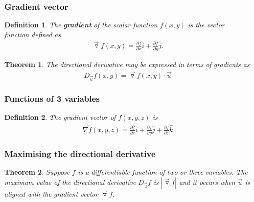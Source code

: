 \documentclass{article}
\theoremstyle{sltheorem}
\newtheorem{definition}{Definition}[section]
\newtheorem{theorem}{Theorem}[section]
\newcommand{\ih}{\widehat i}
\newcommand{\jh}{\widehat j}
\newcommand{\kh}{\widehat k}
\newcommand{\p}{\partial}
\newcommand{\grad}{\vec\triangledown}
\newcommand*\B[1]{\textbf{#1}}
\begin{document}
\subsubsection{Gradient vector}
\begin{definition}
    The \B{gradient} of the scalar function $f(x,y)$ is the vector
    function defined as
    \begin{align*}
        \grad f(x,y)=\frac{\p f}{\p x}\ih + \frac{\p f}{\p y}\jh.
    \end{align*}
\end{definition}
\begin{theorem}
    The directional derivative may be expressed in terms of gradients
    as 
    \begin{align*}
        D_{\vec u}f(x,y)=\grad f(x,y)\cdot \vec u
    \end{align*}
\end{theorem}
\subsubsection{Functions of 3 variables}
\begin{definition}
    The gradient vector of $f(x,y,z)$ is
    \begin{align*}
        \vec\nabla f(x,y,z)=\frac{\p f}{\p x}\ih 
        + \frac{\p f}{\p y}\jh + \frac{\p f}{\p z}\kh
    \end{align*}
\end{definition}
\subsubsection{Maximising the directional derivative}
\begin{theorem}
    Suppose $f$ is a differentiable function of two or three variables.
    The maximum value of the directional derivative $D_{\vec u}f$ is
    $|\grad f|$ and it occurs when $\vec u$ is aligned with the gradient
    vector $\grad f$.
\end{theorem}
\end{document}
